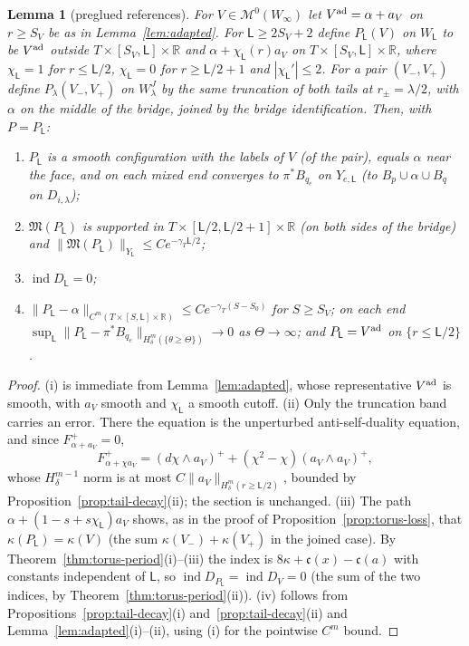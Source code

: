 \documentclass[11pt]{amsart}
\newtheorem{lemma}[theorem]{Lemma}
\theoremstyle{definition}
\theoremstyle{remark}
\theoremstyle{plain}
\numberwithin{equation}{section}
\newcommand{\RR}{\mathbb{R}}
\newcommand{\cM}{\mathcal{M}}
\newcommand{\ind}{\operatorname{ind}}
\begin{document}
\begin{lemma}[preglued references]\label{lem:preglued}
For $V\in\cM^0(W_\infty)$ let $V^{\rm ad}=\alpha+a_V$ on $r\ge S_V$ be as in
Lemma~\ref{lem:adapted}. For $\mathsf L\ge2S_V+2$ define $P_{\mathsf L}(V)$ on $W_\mathsf L$ to be $V^{\rm ad}$
outside $T\times[S_V,\mathsf L]\times\RR$ and $\alpha+\chi_{\mathsf L}(r)a_V$ on $T\times[S_V,\mathsf L]\times\RR$, where
$\chi_\mathsf L=1$ for $r\le \mathsf L/2$, $\chi_\mathsf L=0$ for $r\ge \mathsf L/2+1$ and $|\chi_\mathsf L'|\le2$. For a pair
$(V_-,V_+)$ define $P_\lambda(V_-,V_+)$ on $W^J_\lambda$ by the same truncation of both tails at
$r_\pm=\lambda/2$, with $\alpha$ on the middle of the bridge, joined by the bridge
identification. Then, with $P=P_\mathsf L$:
\begin{enumerate}[label=(\roman*)]
\item $P_\mathsf L$ is a smooth configuration with the labels of $V$ (of the pair), equals $\alpha$ near
  the face, and on each mixed end converges to $\pi^*B_{q_e}$ on $Y_{e,\mathsf L}$ (to
  $B_{p}\cup\alpha\cup B_q$ on $D_{i,\lambda}$);
\item $\mathfrak M(P_\mathsf L)$ is supported in $T\times[\mathsf L/2,\mathsf L/2+1]\times\RR$ (on both sides of the
  bridge) and $\|\mathfrak M(P_\mathsf L)\|_{Y_\mathsf L}\le Ce^{-\gamma_T \mathsf L/2}$;
\item $\ind D_\mathsf L=0$;
\item $\|P_\mathsf L-\alpha\|_{C^m(T\times[S,\mathsf L]\times\RR)}\le Ce^{-\gamma_T(S-S_0)}$ for $S\ge S_V$; on each end
  $\sup_\mathsf L\|P_\mathsf L-\pi^*B_{q_e}\|_{H^m_\delta(\{\theta\ge\Theta\})}\to0$ as $\Theta\to\infty$; and $P_\mathsf L=V^{\rm ad}$
  on $\{r\le \mathsf L/2\}$.
\end{enumerate}
\end{lemma}

\begin{proof}
(i) is immediate from Lemma~\ref{lem:adapted}, whose representative $V^{\rm ad}$ is smooth, with
$a_V$ smooth and $\chi_\mathsf L$ a smooth cutoff. (ii) Only the truncation band
carries an error. There the equation is the unperturbed anti-self-duality
equation, and since $F^+_{\alpha+a_V}=0$,
\[
F^+_{\alpha+\chi a_V}=(d\chi\wedge a_V)^++(\chi^2-\chi)(a_V\wedge a_V)^+ ,
\]
whose $H^{m-1}_\delta$ norm is at most $C\|a_V\|_{H^m_\delta(r\ge \mathsf L/2)}$, bounded by
Proposition~\ref{prop:tail-decay}(ii); the section is unchanged. (iii) The path
$\alpha+(1-s+s\chi_\mathsf L)a_V$ shows, as in the proof of Proposition~\ref{prop:torus-loss}, that $\kappa(P_\mathsf L)=\kappa(V)$ (the sum
$\kappa(V_-)+\kappa(V_+)$ in the joined case). By Theorem~\ref{thm:torus-period}(i)--(iii)
the index is $8\kappa+\mathfrak c(x)-\mathfrak c(a)$ with constants independent of $\mathsf L$, so
$\ind D_{P_\mathsf L}=\ind D_V=0$ (the sum of the two indices, by
Theorem~\ref{thm:torus-period}(ii)). (iv) follows from
Propositions~\ref{prop:tail-decay}(i) and~\ref{prop:tail-decay}(ii) and
Lemma~\ref{lem:adapted}(i)--(ii), using (i) for the pointwise
$C^m$ bound.
\end{proof}
\end{document}
